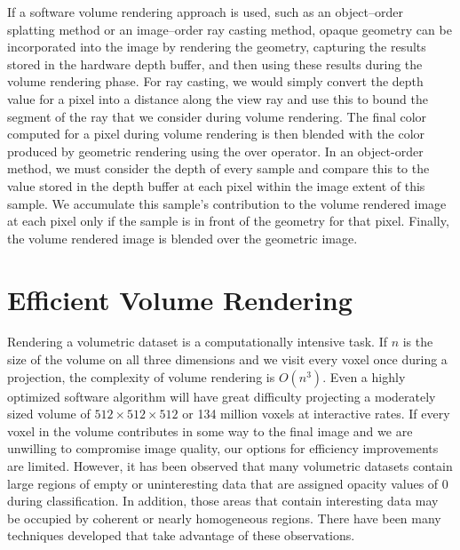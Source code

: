 If a software volume rendering approach is used, such as an object--order splatting method or an image--order ray casting method, opaque geometry can be incorporated into the image by rendering the geometry, capturing the results stored in the hardware depth buffer, and then using these results during the volume rendering phase. For ray casting, we would simply convert the depth value for a pixel into a distance along the view ray and use this to bound the segment of the ray that we consider during volume rendering. The final color computed for a pixel during volume rendering is then blended with the color produced by geometric rendering using the over operator. In an object-order method, we must consider the depth of every sample and compare this to the value stored in the depth buffer at each pixel within the image extent of this sample. We accumulate this sample's contribution to the volume rendered image at each pixel only if the sample is in front of the geometry for that pixel. Finally, the volume rendered image is blended over the geometric image.

\section{Efficient Volume Rendering}

Rendering a volumetric dataset is a computationally intensive task. If $n$ is the size of the volume on all three dimensions and we visit every voxel once during a projection, the complexity of volume rendering is $O(n^3)$. Even a highly optimized software algorithm will have
great difficulty projecting a moderately sized volume of $512 \times 512 \times 512$ or 134 million voxels at interactive rates. If every voxel in the volume contributes in some way to the final image and we are unwilling to compromise image quality, our options for efficiency improvements are limited. However, it has been observed that many volumetric datasets contain large regions of empty or uninteresting data that are assigned opacity values of $0$ during classification. In addition, those areas that contain interesting data may be occupied by coherent or nearly homogeneous regions. There have been many techniques developed that take advantage of these observations.

